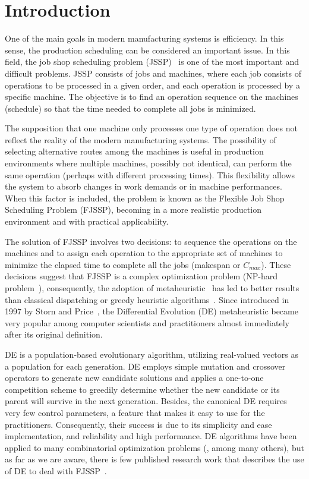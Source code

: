 \section{Introduction}
 
One of the main goals in modern manufacturing systems is efficiency. In this sense, the production scheduling can be considered an important issue. In this field, the job shop scheduling problem (JSSP)~\cite{Pinedo:2008:STA:1477600} is one of the most important and difficult problems. JSSP consists of jobs and machines, where each job consists of operations to be processed in a given order, and each operation is processed by a specific machine. The objective is to find an operation sequence on the machines (schedule) so that the time needed to complete all jobs is minimized. 

The supposition that one machine only processes one type of operation does not reflect the reality of the modern manufacturing systems. The possibility of selecting alternative routes among the machines is useful in production environments where multiple machines, possibly not identical, can perform the same operation (perhaps with different processing times). This flexibility allows the system to absorb changes in work demands or in machine performances. When this factor is included, the problem is known as the Flexible Job Shop Scheduling Problem (FJSSP), becoming in a more realistic production environment and with practical applicability.

The solution of FJSSP involves two decisions: to sequence the operations on the machines and to assign each operation to the appropriate set of machines to minimize the elapsed time to complete all the jobs (makespan or $C_{max}$). These decisions suggest that FJSSP is a complex optimization problem (NP-hard problem~\cite{Garey:1976:CFJ:2782828.2782830}), consequently, the adoption of metaheuristic~\cite{Talbi,Luque:2013:PGA:2564896} has led to better results than classical dispatching or greedy heuristic algorithms~\cite{tang2011,Wang2012917,WANG2017}. Since introduced in 1997 by Storn and Price~\cite{Storn1997}, the Differential Evolution (DE) metaheuristic became very popular among computer scientists and practitioners almost immediately after its original definition. 

DE is a population-based evolutionary algorithm, utilizing real-valued vectors as a population for each generation. DE employs simple mutation and crossover operators to generate new candidate solutions and applies a one-to-one competition scheme to greedily determine whether the new candidate or its parent will survive in the next generation. Besides, the canonical DE requires very few control parameters, a feature that makes it easy to use for the practitioners. Consequently, their success is due to its simplicity and ease implementation, and reliability and high performance. DE algorithms have been applied to many combinatorial optimization problems (\cite{Teoh:2015:DE-CVRP,GRECO20191,Hull:DE-StructuralOpt,Rout2010}, among many others), but as far as we are aware, there is few published research work that describes the use of DE to deal with FJSSP~\cite{YUAN2013246}. 


